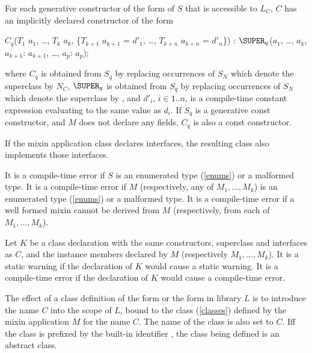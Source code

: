 \documentclass{article}
\begin{document}
\LMHash{}
For each generative constructor of the form  of $S$ that is accessible to $L_C$, $C$ has an implicitly declared constructor of the form
\begin{dartCode}
$C_q$($T_{1}$ $a_{1}$, \ldots , $T_{k}$ $a_{k}$, \{$T_{k+1}$ $a_{k+1}$ = $d'_1$, \ldots , $T_{k+n}$ $a_{k+n}$ = $d'_n$\})
    : $\SUPER_q$($a_{1}$, \ldots , $a_{k}$, $a_{k+1}$: $a_{k+1}$, \ldots, $a_p$: $a_p$);
\end{dartCode}

\noindent
where $C_q$ is obtained from $S_q$ by replacing occurrences of $S_N$
which denote the superclass by $N_C$,
$\SUPER_q$ is obtained from $S_q$ by replacing occurrences of $S_N$
which denote the superclass by \SUPER{},
and $d'_i$, $i \in 1..n$, is a compile-time constant expression evaluating to the same value as $d_i$.
If $S_q$ is a generative const constructor, and $M$ does not declare any
fields, $C_q$ is also a const constructor.

\LMHash{}
If the mixin application class declares interfaces, the resulting class also implements those interfaces.

\LMHash{}
It is a compile-time error if $S$ is an enumerated type (\ref{enums}) or a malformed type.
It is a compile-time error if $M$ (respectively, any of $M_1, \ldots, M_k$) is an enumerated type (\ref{enums}) or a malformed type.
It is a compile-time error if a well formed mixin cannot be derived from $M$ (respectively, from each of $M_1, \ldots, M_k$).

\LMHash{}
Let $K$ be a class declaration with the same constructors, superclass and interfaces as $C$, and the instance members declared by $M$ (respectively $M_1, \ldots, M_k$).
It is a static warning if the declaration of $K$ would cause a static warning.
It is a compile-time error if the declaration of $K$ would cause a compile-time error.


\LMHash{}
The effect of a class definition of the form  or the form  in library $L$ is to introduce the name $C$ into the scope of $L$, bound to the class (\ref{classes}) defined by the mixin application $M$ for the name $C$.
The name of the class is also set to $C$.
If{}f the class is prefixed by the built-in identifier \ABSTRACT{}, the class being defined is an abstract class.
\end{document}
